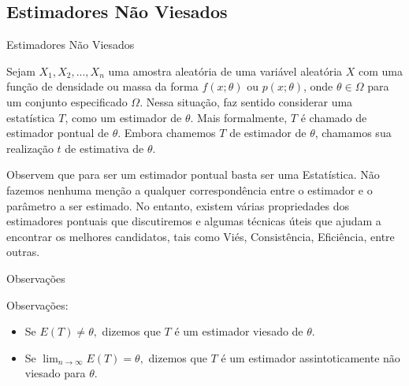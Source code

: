 \documentclass[12pt]{beamer}
\begin{document}
\subsection{Estimadores Não Viesados}
\begin{frame}{Estimadores Não Viesados}
    \begin{block}{}
        \justifying
Sejam $X_{1},X_{2},...,X_{n}$ uma amostra aleatória de uma variável aleatória $X$ com uma função de densidade ou massa da forma $f(x;\theta)$ ou $p(x;\theta)$, onde $\theta \in \Omega$ para um conjunto especificado $\Omega$. Nessa situação, faz sentido considerar uma estatística $T$, como um estimador de $\theta$. Mais formalmente, $T$ é chamado de estimador pontual de $\theta$. Embora chamemos $T$ de estimador de $\theta$, chamamos sua realização $t$ de estimativa de $\theta$.
    \end{block}
    \pause
\begin{block}{}
    \justifying
    Observem que para ser um estimador pontual basta ser uma Estatística. Não fazemos nenhuma menção a qualquer correspondência entre o estimador e o parâmetro a ser estimado. No entanto, existem várias propriedades dos estimadores pontuais que discutiremos e algumas técnicas úteis que ajudam a encontrar os melhores candidatos, tais como Viés, Consistência, Eficiência, entre outras. %
\end{block}
\end{frame}

\begin{frame}{Observações}
    \begin{block}{Observações:}
\begin{itemize}
	        \justifying
    \item Se $E(T)\neq \theta,$ dizemos que $T$ é um estimador viesado de $\theta.$\pause
    \item Se ${\displaystyle \lim_{n\rightarrow \infty}E(T)=\theta},$ dizemos que $T$ é um estimador assintoticamente não viesado para $\theta.$
\end{itemize}
\end{block}
\end{frame}
\end{document}
